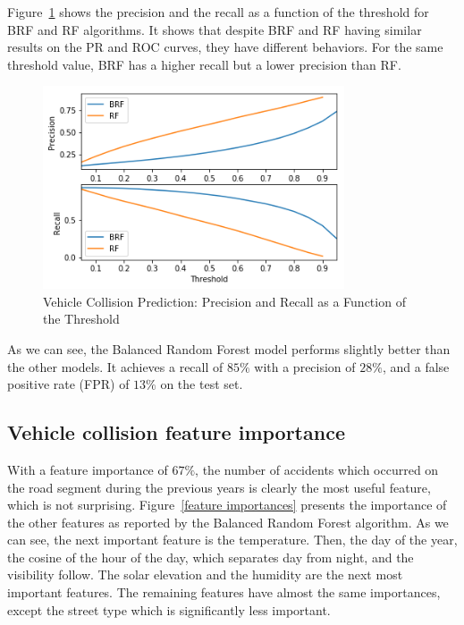 \documentclass[conference]{IEEEtran}
\begin{document}
Figure~\ref{fig:pr-threshold} shows the precision and the recall as a function of the threshold for BRF and RF algorithms.
It shows that despite BRF and RF having similar results on the PR and ROC curves, they have different behaviors. For the same threshold value, BRF has a higher recall but a lower precision than RF.

\begin{figure}[htbp]
\centerline{\includegraphics[height=6cm, keepaspectratio]{Figures/pr_threshold.png}}
\caption{Vehicle Collision Prediction: Precision and Recall as a Function of the Threshold}
\label{fig:pr-threshold}
\end{figure}

As we can see, the Balanced Random Forest model performs slightly better than the other models.
It achieves a recall of $85\%$ with a precision of $28\%$, and a false positive rate (FPR) of $13\%$ on the test set.


\subsection{Vehicle collision feature importance}

With a
feature importance of $67\%$, the number of accidents which occurred on the
road segment during the previous years is clearly the most useful feature, which
is not surprising. Figure~\ref{feature importances} presents the
importance of the other features as reported by the Balanced Random Forest
algorithm. As we can see, the next important feature is the temperature. 
Then, the day of the year, the cosine of the hour of the day, which separates day from night,
and the visibility follow. The solar elevation and the humidity are the next most important features. The remaining features have almost the same importances, except the street type which
is significantly less important.
\end{document}
